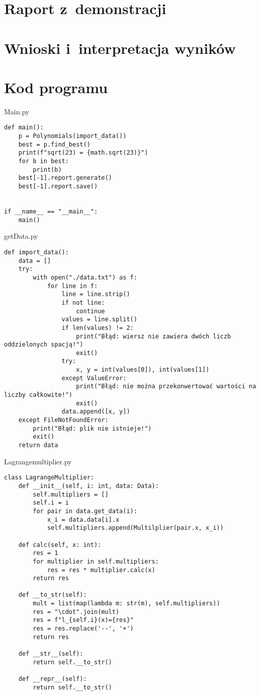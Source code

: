 \documentclass[12pt]{article}
\begin{document}
\section{Raport z~demonstracji}

\section{Wnioski i~interpretacja wyników}

\section{Kod programu}
Main.py
\begin{lstlisting}[frame=single]
def main():
    p = Polynomials(import_data())
    best = p.find_best()
    print(f"sqrt(23) = {math.sqrt(23)}")
    for b in best:
        print(b)
    best[-1].report.generate()
    best[-1].report.save()


if __name__ == "__main__":
    main()

\end{lstlisting}

getData.py
\begin{lstlisting}[frame=single]
def import_data():
    data = []
    try:
        with open("./data.txt") as f:
            for line in f:
                line = line.strip()
                if not line:
                    continue
                values = line.split()
                if len(values) != 2:
                    print("Błąd: wiersz nie zawiera dwóch liczb oddzielonych spacją!")
                    exit()
                try:
                    x, y = int(values[0]), int(values[1])
                except ValueError:
                    print("Błąd: nie można przekonwertować wartości na liczby całkowite!")
                    exit()
                data.append([x, y])
    except FileNotFoundError:
        print("Błąd: plik nie istnieje!")
        exit()
    return data
\end{lstlisting}

Lagrangemultiplier.py
\begin{lstlisting}[frame=single]
class LagrangeMultiplier:
    def __init__(self, i: int, data: Data):
        self.multipliers = []
        self.i = i
        for pair in data.get_data(i):
            x_i = data.data[i].x
            self.multipliers.append(Multilplier(pair.x, x_i))

    def calc(self, x: int):
        res = 1
        for multiplier in self.multipliers:
            res = res * multiplier.calc(x)
        return res

    def __to_str(self):
        mult = list(map(lambda m: str(m), self.multipliers))
        res = "\cdot".join(mult)
        res = f"l_{self.i}(x)={res}"
        res = res.replace('--', '+')
        return res

    def __str__(self):
        return self.__to_str()

    def __repr__(self):
        return self.__to_str()
\end{lstlisting}
\end{document}
